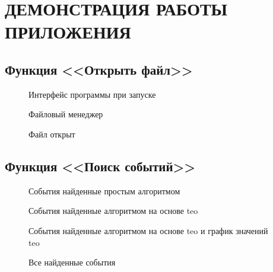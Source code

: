 \section{ДЕМОНСТРАЦИЯ РАБОТЫ ПРИЛОЖЕНИЯ}

\subsection{Функция <<Открыть файл>>}

\begin{figure}[H]
  \caption{Интерфейс программы при запуске}
  \label{ris:startup}
\end{figure}


\begin{figure}[H]
  \caption{Файловый менеджер}
  \label{ris:file_manager}
\end{figure}

\begin{figure}[H]
  \caption{Файл открыт}
  \label{ris:opened_file}
\end{figure}

\subsection{Функция <<Поиск событий>>}

\begin{figure}[H]
  \caption{События найденные простым алгоритмом}
  \label{ris:naive_events}
\end{figure}

\begin{figure}[H]
  \caption{События найденные алгоритмом на основе \acrshort{teo}}
  \label{ris:teo_events}
\end{figure}

\begin{figure}[H]
  \caption{События найденные алгоритмом на основе \acrshort{teo} и график значений \acrshort{teo}}
  \label{ris:teo_events_and_values}
\end{figure}

\begin{figure}[H]
  \caption{Все найденные события}
  \label{ris:all_events}
\end{figure}

